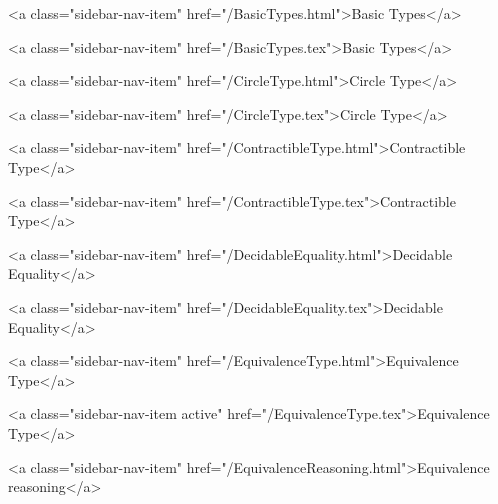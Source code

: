           <a class="sidebar-nav-item" href="/BasicTypes.html">Basic Types</a>
        
      
    
      
        
          <a class="sidebar-nav-item" href="/BasicTypes.tex">Basic Types</a>
        
      
    
      
        
          <a class="sidebar-nav-item" href="/CircleType.html">Circle Type</a>
        
      
    
      
        
          <a class="sidebar-nav-item" href="/CircleType.tex">Circle Type</a>
        
      
    
      
        
          <a class="sidebar-nav-item" href="/ContractibleType.html">Contractible Type</a>
        
      
    
      
        
          <a class="sidebar-nav-item" href="/ContractibleType.tex">Contractible Type</a>
        
      
    
      
        
          <a class="sidebar-nav-item" href="/DecidableEquality.html">Decidable Equality</a>
        
      
    
      
        
          <a class="sidebar-nav-item" href="/DecidableEquality.tex">Decidable Equality</a>
        
      
    
      
        
          <a class="sidebar-nav-item" href="/EquivalenceType.html">Equivalence Type</a>
        
      
    
      
        
          <a class="sidebar-nav-item active" href="/EquivalenceType.tex">Equivalence Type</a>
        
      
    
      
        
          <a class="sidebar-nav-item" href="/EquivalenceReasoning.html">Equivalence reasoning</a>
        
      
    
